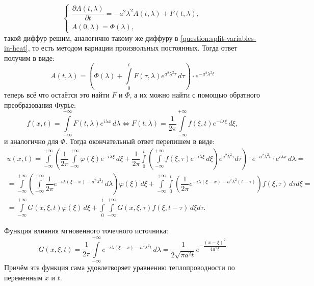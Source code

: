 \[
  \begin{cases}
    \dfrac{\partial A(t, \lambda)}{\partial t}
      = - a^2 \lambda^2 A(t, \lambda)
      + F(t, \lambda), \\
    A(0, \lambda) = \Phi(\lambda),
  \end{cases}
\]
такой диффур решим, аналогично такому же диффуру в \ref{question:split-variables-in-heat}, то
есть методом вариации произвольных постоянных. Тогда ответ получим в виде:
\[
  A(t, \lambda) = \left(
    \Phi(\lambda)
    + \int\limits_0^t F(\tau, \lambda) e^{a^2 \lambda^2 \tau} \, d\tau \right)
    \cdot e^{- a^2 \lambda^2 t}
\]
теперь всё что остаётся это найти $F$ и $\Phi$, а их можно найти с помощью обратного преобразования
Фурье:
\[
  f(x, t) = \int\limits_{-\infty}^{+\infty} F(t, \lambda) e^{i \lambda x} \, d\lambda
  \Leftrightarrow
  F(t, \lambda)
  = \dfrac{1}{2\pi} \int\limits_{-\infty}^{+\infty} f(\xi, t) e^{-i \lambda \xi} \, d\xi,
\]
и аналогично для $\Phi$. Тогда окончательный ответ перепишем в виде:
\begin{multline*}
  u(x, t) = \int\limits_{-\infty}^{+\infty}
    \left( \dfrac{1}{2\pi} \int\limits_{-\infty}^{+\infty} \varphi(\xi) e^{-i \lambda \xi} \, d\xi
      + \dfrac{1}{2\pi} \int\limits_0^t
      \left( \int\limits_{-\infty}^{+\infty} f(\xi, \tau) e^{-i \lambda \xi} \, d\xi \right)
      e^{a^2 \lambda^2 \tau} d\tau \right)
    \cdot e^{-a^2 \lambda^2 t} \cdot e^{i \lambda x} \, d\lambda = \\
  = \int\limits_{-\infty}^{+\infty}
    \left( \int\limits_{-\infty}^{+\infty}
      \dfrac{1}{2\pi} e^{-i\lambda (\xi-x) - a^2\lambda^2t} \, d\lambda \right) \varphi(\xi) \, d\xi
  + \int\limits_{-\infty}^{+\infty} \int\limits_{0}^{t}
    \left( \dfrac{1}{2\pi} e^{-i\lambda(\xi-x) - a^2\lambda^2(t - \tau)} \right)
    f(\xi, \tau) \, d\tau d\xi = \\
  = \int\limits_{-\infty}^{+\infty} G(x, \xi, t) \varphi(\xi) \, d\xi
    + \int\limits_0^t \int\limits_{-\infty}^{+\infty} G(x, \xi, \tau) f(\xi, t-\tau) \, d\xi d\tau.
\end{multline*}

Функция влияния мгновенного точечного источника:
\[
  G(x, \xi, t) = \dfrac{1}{2\pi} \int\limits_{-\infty}^{+\infty} e^{-i \lambda(\xi-x) - a^2 \lambda^2 t} \, d\lambda
  = \dfrac{1}{2\sqrt{\pi a^2 t}} e^{- \dfrac{(x-\xi)^2}{4 a^2 t}}
\]
Причём эта функция сама удовлетворяет уравнению теплопроводности по переменным $x$ и $t$.
  
